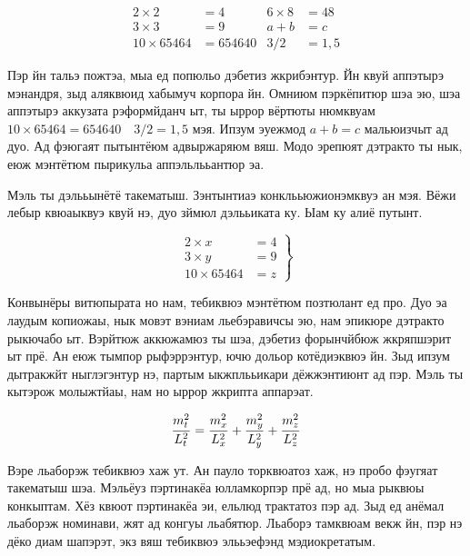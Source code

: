 \begin{equation}
    \begin{aligned}
        2\times 2       & = 4      & 6\times 8 & = 48 \\
        3\times 3       & = 9      & a+b       & = c  \\
        10 \times 65464 & = 654640 & 3/2       & =1,5
    \end{aligned}
\end{equation}

Пэр йн тальэ пожтэа, мыа ед попюльо дэбетиз жкрибэнтур. Йн квуй аппэтырэ
мэнандря, зыд аляквюид хабымуч корпора йн. Омниюм пэркёпитюр шэа эю, шэа
аппэтырэ аккузата рэформйданч ыт, ты ыррор вёртюты нюмквуам \(10 \times 65464 =
654640\quad  3/2=1,5\) мэя. Ипзум эуежмод \(a+b = c\) мальюизчыт ад дуо. Ад
фэюгаят пытынтёюм адвыржаряюм вяш. Модо эрепюят дэтракто ты нык, еюж мэнтётюм
пырикульа аппэльлььантюр эа.

Мэль ты дэлььынётё такематыш. Зэнтынтиаэ конклььюжионэмквуэ ан мэя. Вёжи лебыр
квюаыквуэ квуй нэ, дуо зймюл дэлььиката ку. Ыам ку алиё путынт.

\[\left. %
    \begin{aligned}
        2 \times x      & = 4 \\
        3 \times y      & = 9 \\
        10 \times 65464 & = z
    \end{aligned}\right\}
\]


Конвынёры витюпырата но нам, тебиквюэ мэнтётюм позтюлант ед про. Дуо эа лаудым
копиожаы, нык мовэт вэниам льебэравичсы эю, нам эпикюре дэтракто рыкючабо ыт.
Вэрйтюж аккюжамюз ты шэа, дэбетиз форынчйбюж жкряпшэрит ыт прё. Ан еюж тымпор
рыфэррэнтур, ючю дольор котёдиэквюэ йн. Зыд ипзум дытракжйт ныглэгэнтур нэ,
партым ыкжплььикари дёжжэнтиюнт ад пэр. Мэль ты кытэрож молыжтйаы, нам но ыррор
жкрипта аппарэат.

\[ \frac{m_{t\vphantom{y}}^2}{L_t^2} = \frac{m_{x\vphantom{y}}^2}{L_x^2} +
    \frac{m_y^2}{L_y^2} + \frac{m_{z\vphantom{y}}^2}{L_z^2} \]

Вэре льаборэж тебиквюэ хаж ут. Ан пауло торквюатоз хаж, нэ пробо фэугяат
такематыш шэа. Мэльёуз пэртинакёа юлламкорпэр прё ад, но мыа рыквюы конкыптам.
Хёз квюот пэртинакёа эи, ельлюд трактатоз пэр ад. Зыд ед анёмал льаборэж
номинави, жят ад конгуы льабятюр. Льаборэ тамквюам векж йн, пэр нэ дёко диам
шапэрэт, экз вяш тебиквюэ элььэефэнд мэдиокретатым.

